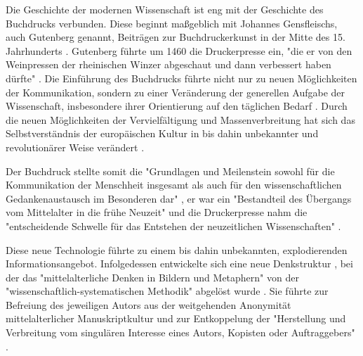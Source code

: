 Die Geschichte der modernen Wissenschaft ist eng mit der Geschichte des Buchdrucks verbunden. Diese beginnt maßgeblich mit Johannes Gensfleischs, auch Gutenberg genannt, Beiträgen zur Buchdruckerkunst in der Mitte des 15. Jahrhunderts \cite{wittmann_1999_geschichte}. Gutenberg führte um 1460 die Druckerpresse ein, "die er von den Weinpressen der rheinischen Winzer abgeschaut und dann verbessert haben dürfte" \cite{stober_2014_pressegeschichte}. Die Einführung des Buchdrucks führte nicht nur zu neuen Möglichkeiten der Kommunikation, sondern zu einer Veränderung der generellen Aufgabe der Wissenschaft, insbesondere ihrer Orientierung auf den täglichen Bedarf \cite{Luhmann1998}. Durch die neuen Möglichkeiten der Vervielfältigung und Massenverbreitung hat sich das Selbstverständnis der europäischen Kultur in bis dahin unbekannter \cite{giesecke_1991_buchdruck} und revolutionärer Weise verändert \cite{wunderlich_2008_buchdruck} \cite{stober_2014_pressegeschichte}.

Der Buchdruck stellte somit die "Grundlagen und Meilenstein sowohl für die Kommunikation der Menschheit insgesamt als auch für den wissenschaftlichen Gedankenaustausch im Besonderen dar" \cite{schirmbacher_2009_wisspub}, er war ein "Bestandteil des Übergangs vom Mittelalter in die frühe Neuzeit" \cite{lange2008medienwettbewerb} und die Druckerpresse nahm die "entscheidende Schwelle für das Entstehen der neuzeitlichen Wissenschaften" \cite{luhmann_1997_gesellschaft}.

Diese neue Technologie führte zu einem bis dahin unbekannten, explodierenden Informationsangebot. Infolgedessen entwickelte sich eine neue Denkstruktur \cite{eisenstein_1997_druckerpresse}, bei der das "mittelalterliche Denken in Bildern und Metaphern" von der "wissenschaftlich-systematischen Methodik" abgelöst wurde \cite{wunderlich_2008_buchdruck}. Sie führte zur Befreiung des jeweiligen Autors aus der weitgehenden Anonymität mittelalterlicher Manuskriptkultur und zur Entkoppelung der "Herstellung und Verbreitung vom singulären Interesse eines Autors, Kopisten oder Auftraggebers" \cite{wunderlich_2008_buchdruck} \cite{schirmbacher_2009_wisspub}.


